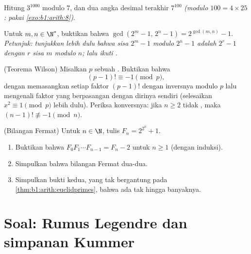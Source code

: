 \begin{exercise}[$\star\star$]\label{exo:b1:arith:9}
Hitung $3^{1000}$ modulo $7$, dan dua angka desimal terakhir
$7^{100}$ \emph{(modulo $100 = 4 \times 25$: pakai
\cref{exo:b1:arith:8})}.
\end{exercise}

\begin{exercise}[$\star\star\star$]\label{exo:b1:arith:10}
Untuk $m, n \in \N^*$, buktikan bahwa $\gcd(2^m - 1,\, 2^n - 1) =
2^{\gcd(m,n)} - 1$. \emph{Petunjuk: tunjukkan lebih dulu bahwa sisa $2^m
- 1$ modulo $2^n - 1$ adalah $2^r - 1$ dengan $r$ sisa $m$ modulo
$n$; lalu ikuti .}
\end{exercise}

\begin{exercise}[$\star\star\star$]\label{exo:b1:arith:11}
(Teorema Wilson) Misalkan $p$ sebuah . Buktikan bahwa
\[
(p-1)! \equiv -1 \pmod p ,
\]
dengan memasangkan setiap faktor $(p-1)!$ dengan inversnya modulo $p$ lalu
mengenali faktor yang berpasangan dengan dirinya sendiri (selesaikan $x^2 \equiv 1 \pmod p$
lebih dulu). Periksa konversnya: jika $n \geq 2$ tidak , maka $(n-1)!
\not\equiv -1 \pmod n$.
\end{exercise}

\begin{exercise}[$\star\star\star$]\label{exo:b1:arith:12}
(Bilangan Fermat) Untuk $n \in \N$, tulis $F_n = 2^{2^n} + 1$.
\begin{enumerate}
  \item Buktikan bahwa $F_0 F_1 \cdots F_{n-1} = F_n - 2$ untuk $n \geq
        1$ (dengan induksi).
  \item Simpulkan bahwa bilangan Fermat  dua-dua.
  \item Simpulkan bukti kedua, yang tak bergantung pada
        \cref{thm:b1:arith:euclidprimes}, bahwa  ada
        tak hingga banyaknya.
\end{enumerate}
\end{exercise}

\section{Soal: Rumus Legendre dan simpanan Kummer}

